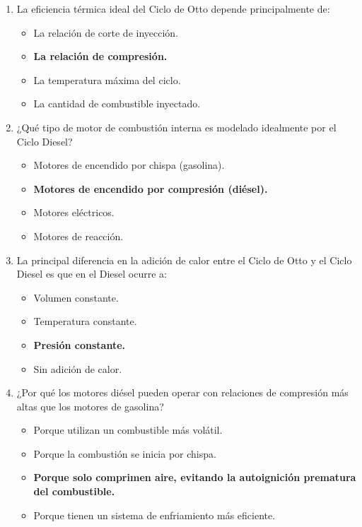 \documentclass{article}
\begin{document}
\begin{enumerate}[label=\arabic*.]
    \item La eficiencia térmica ideal del Ciclo de Otto depende principalmente de:
    \begin{itemize}[label=\alph*)]
        \item La relación de corte de inyección.
        \item \textbf{La relación de compresión.}
        \item La temperatura máxima del ciclo.
        \item La cantidad de combustible inyectado.
    \end{itemize}

    \item ¿Qué tipo de motor de combustión interna es modelado idealmente por el Ciclo Diesel?
    \begin{itemize}[label=\alph*)]
        \item Motores de encendido por chispa (gasolina).
        \item \textbf{Motores de encendido por compresión (diésel).}
        \item Motores eléctricos.
        \item Motores de reacción.
    \end{itemize}

    \item La principal diferencia en la adición de calor entre el Ciclo de Otto y el Ciclo Diesel es que en el Diesel ocurre a:
    \begin{itemize}[label=\alph*)]
        \item Volumen constante.
        \item Temperatura constante.
        \item \textbf{Presión constante.}
        \item Sin adición de calor.
    \end{itemize}

    \item ¿Por qué los motores diésel pueden operar con relaciones de compresión más altas que los motores de gasolina?
    \begin{itemize}[label=\alph*)]
        \item Porque utilizan un combustible más volátil.
        \item Porque la combustión se inicia por chispa.
        \item \textbf{Porque solo comprimen aire, evitando la autoignición prematura del combustible.}
        \item Porque tienen un sistema de enfriamiento más eficiente.
    \end{itemize}


\end{enumerate}
\end{document}
